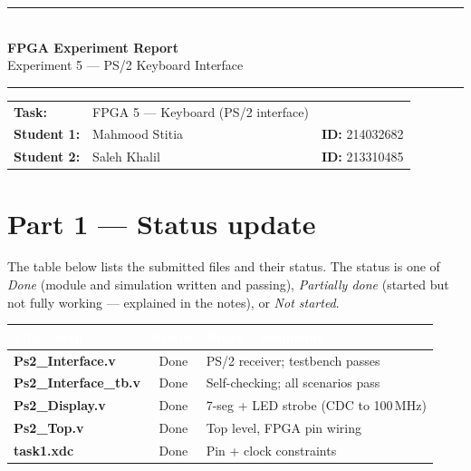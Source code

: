 \documentclass[11pt,a4paper]{article}
\begin{document}
\thispagestyle{fancy}
\begin{center}
  {\color{accent}\rule{\linewidth}{1.4pt}}\\[10pt]
  {\fontsize{24}{28}\selectfont \textbf{\color{accent}FPGA Experiment Report}}\\[6pt]
  {\large Experiment 5 --- PS/2 Keyboard Interface}\\[8pt]
  {\color{accent}\rule{\linewidth}{1.4pt}}
\end{center}

\vspace{6pt}

\renewcommand{\arraystretch}{1.3}
\begin{center}
\begin{tabular}{@{}l l l@{}}
\textbf{Task:} & FPGA 5 --- Keyboard (PS/2 interface) & \\
\textbf{Student 1:} & Mahmood Stitia & \textbf{ID:} 214032682 \\
\textbf{Student 2:} & Saleh Khalil  & \textbf{ID:} 213310485 \\
\end{tabular}
\end{center}

\vspace{6pt}

\section*{Part 1 --- Status update}

The table below lists the submitted files and their status. The status is one of
\emph{Done} (module and simulation written and passing), \emph{Partially done}
(started but not fully working --- explained in the notes), or \emph{Not started}.

\vspace{4pt}
\renewcommand{\arraystretch}{1.5}
\begin{tabularx}{\textwidth}{|>{\bfseries\ttfamily}l|c|X|}
\hline
\rowcolor{accent}
\textcolor{white}{\textbf{File / Step}} & \textcolor{white}{\textbf{Status}} & \textcolor{white}{\textbf{Notes / comments}} \\ \hline
\rowcolor{accentlt}
Ps2\_Interface.v     & Done & PS/2 receiver; testbench passes \\ \hline
Ps2\_Interface\_tb.v & Done & Self-checking; all scenarios pass \\ \hline
\rowcolor{accentlt}
Ps2\_Display.v       & Done & 7-seg + LED strobe (CDC to 100\,MHz) \\ \hline
Ps2\_Top.v           & Done & Top level, FPGA pin wiring \\ \hline
\rowcolor{accentlt}
task1.xdc            & Done & Pin + clock constraints \\ \hline
\end{tabularx}
\renewcommand{\arraystretch}{1.0}
\end{document}
